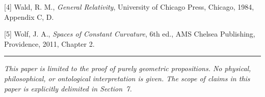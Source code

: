 \documentclass[a4paper,11pt]{article}
\theoremstyle{definition}
\begin{document}
\noindent
{[4]} Wald, R. M., \textit{General Relativity}, University of Chicago Press, Chicago, 1984, Appendix C, D.

\noindent
{[5]} Wolf, J. A., \textit{Spaces of Constant Curvature}, 6th ed., AMS Chelsea Publishing, Providence, 2011, Chapter 2.

\bigskip\hrule\bigskip

\begin{center}
\textit{This paper is limited to the proof of purely geometric propositions. No physical, philosophical, or ontological interpretation is given. The scope of claims in this paper is explicitly delimited in Section~7.}
\end{center}
\end{document}
